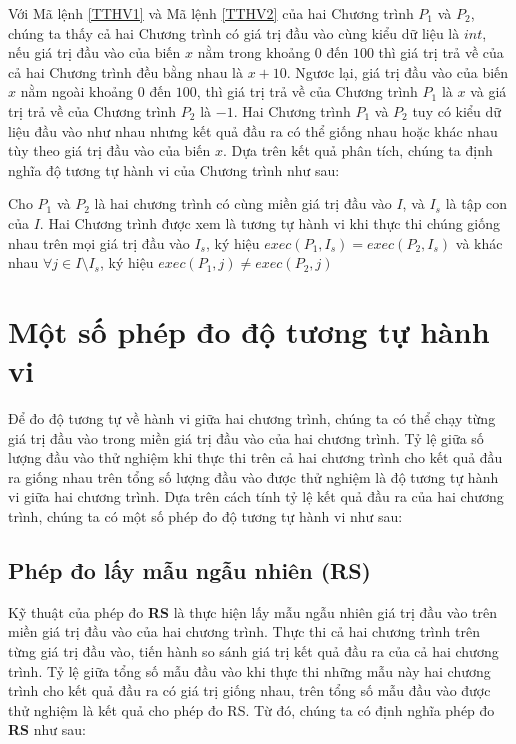 Với Mã lệnh \ref{TTHV1} và Mã lệnh \ref{TTHV2} của hai Chương trình $P_{1}$ và $P_{2}$, chúng ta thấy cả hai Chương trình có giá trị đầu vào cùng kiểu dữ liệu là $int$, nếu giá trị đầu vào của biến $x$ nằm trong khoảng $0$ đến $100$ thì giá trị trả về của cả hai Chương trình đều bằng nhau là $x+10$. Ngươc lại, giá trị đầu vào của biến $x$ nằm ngoài khoảng $0$ đến $100$, thì giá trị trả về của Chương trình $P_{1}$ là $x$ và giá trị trả về của Chương trình $P_{2}$ là $-1$. Hai Chương trình $P_{1}$ và $P_{2}$ tuy có kiểu dữ liệu đầu vào như nhau nhưng kết quả đầu ra có thể giống nhau hoặc khác nhau tùy theo giá trị đầu vào của biến $x$. Dựa trên kết quả phân tích, chúng ta định nghĩa độ tương tự hành vi của Chương trình như sau:

\begin{definition}
Cho $P_{1}$ và $P_{2}$ là hai chương trình có cùng miền giá trị đầu vào $I$, và $I_{s}$ là tập con của $I$. Hai Chương trình được xem là tương tự hành vi khi thực thi chúng giống nhau trên mọi giá trị đầu vào $I_{s}$, ký hiệu  $exec(P_{1}, I_{s}) = exec(P_{2}, I_{s})$ và khác nhau $\forall j \in I \setminus I_{s}$, ký hiệu $exec(P_{1}, j) \neq exec(P_{2}, j)$
\end{definition}

\section{Một số phép đo độ tương tự hành vi}
Để đo độ tương tự về hành vi giữa hai chương trình, chúng ta có thể chạy từng giá trị đầu vào trong miền giá trị đầu vào của hai chương trình. Tỷ lệ giữa số lượng đầu vào thử nghiệm khi thực thi trên cả hai chương trình cho kết quả đầu ra giống nhau trên tổng số lượng đầu vào được thử nghiệm là độ tương tự hành vi giữa hai chương trình. Dựa trên cách tính tỷ lệ kết quả đầu ra của hai chương trình, chúng ta có một số phép đo độ tương tự hành vi như sau:

\subsection{Phép đo lấy mẫu ngẫu nhiên (RS)}
Kỹ thuật của phép đo \textbf{RS} là thực hiện lấy mẫu ngẫu nhiên giá trị đầu vào trên miền giá trị đầu vào của hai chương trình. Thực thi cả hai chương trình trên từng giá trị đầu vào, tiến hành so sánh giá trị kết quả đầu ra của cả hai chương trình. Tỷ lệ giữa tổng số mẫu đầu vào khi thực thi những mẫu này hai chương trình cho kết quả đầu ra có giá trị giống nhau, trên tổng số mẫu đầu vào được thử nghiệm là kết quả cho phép đo RS. Từ đó, chúng ta có định nghĩa phép đo \textbf{RS} như sau:

